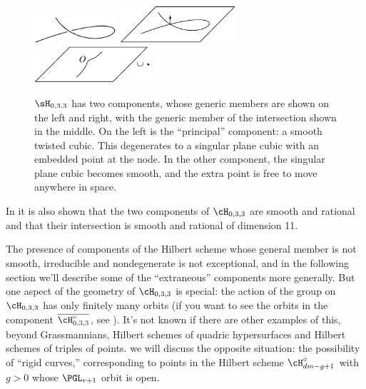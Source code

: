 \begin{figure}
\inprogress
\leavevmode
{}\hbox{\includegraphics[width=1.2in]{main/Fig18-1A}}\quad
\includegraphics[width=1.7in]{main/Fig18-1B}%
\includegraphics[width=1.7in]{main/Fig18-1C}%
\caption{$\sH_{0,3,3}$ has two components, whose generic members are
shown on the left and right,
with the generic member of the intersection shown in the middle. On
the left is
 the ``principal'' component: a
smooth
twisted cubic. This degenerates to a singular plane
cubic with an embedded point at the node. In the other component, the
singular plane cubic
becomes smooth, and the extra point is free to move anywhere in space.}
\label{Fig18.1}
\end{figure}


\begin{fact}
In \cite{Piene-Schlessinger} it is also shown that the two components
%
%
of $\cH_{0,3,3}$ are smooth and rational and that
their  intersection is  smooth and rational of dimension 11.
\end{fact}

The presence of components of the Hilbert scheme whose general member is
not smooth, irreducible and nondegenerate is not exceptional, and in the
following section we'll describe some of the ``extraneous'' components more
generally. But one aspect of the geometry of $\cH_{0,3,3}$ is special:
the action of the group 
%
on $\cH_{0,3,3}$ has only finitely
many orbits (if you want to see the orbits in the
component
$\overline{\cH^\circ_{0,3,3}}$, see \cite{Montreal}). It's not known if
there are other examples of this, beyond Grassmannians, Hilbert schemes
of quadric hypersurfaces and Hilbert schemes of triples of points.
we will discuss the opposite situation: the
%
possibility of ``rigid curves,''  corresponding to points in the Hilbert
scheme $\cH^{\circ}_{dm-g+1}$ with $g>0$ whose $\PGL_{r+1}$ orbit is open.

